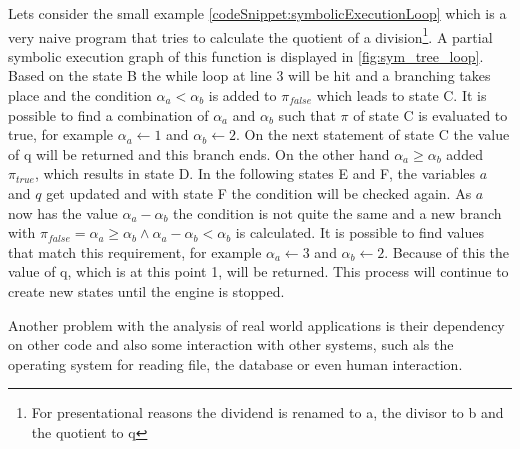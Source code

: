 Lets consider the small example \ref{codeSnippet:symbolicExecutionLoop} which is a very naive program that tries to calculate the quotient of a division\footnote{For presentational reasons the dividend is renamed to a, the divisor to b and the quotient to q}. A partial symbolic execution graph of this function is displayed in \ref{fig:sym_tree_loop}. Based on the state B the while loop at line 3 will be hit and a branching takes place and the condition $\alpha_a < \alpha_b$ is added to $\pi_{false}$ which leads to state C. It is possible to find a combination of $\alpha_a$ and $\alpha_b$ such that $\pi$ of state C is evaluated to true, for example $\alpha_a \gets 1$ and $\alpha_b \gets 2$. On the next statement of state C the value of q will be returned and this branch ends. On the other hand $\alpha_a \geq \alpha_b$ added $\pi_{true}$, which results in state D. In the following states E and F, the variables $a$ and $q$ get updated and with state F the condition will be checked again. As $a$ now has the value $\alpha_a - \alpha_b$ the condition is not quite the same and a new branch with $\pi_{false} = \alpha_a \geq \alpha_b \land \alpha_a - \alpha_b < \alpha_b$ is calculated. It is possible to find values that match this requirement, for example $\alpha_a \gets 3$ and $\alpha_b \gets 2$. Because of this the value of q, which is at this point 1, will be returned. This process will continue to create new states until the engine is stopped.

Another problem with the analysis of real world applications is their dependency on other code and also some interaction with other systems, such als the operating system for reading file, the database or even human interaction.

